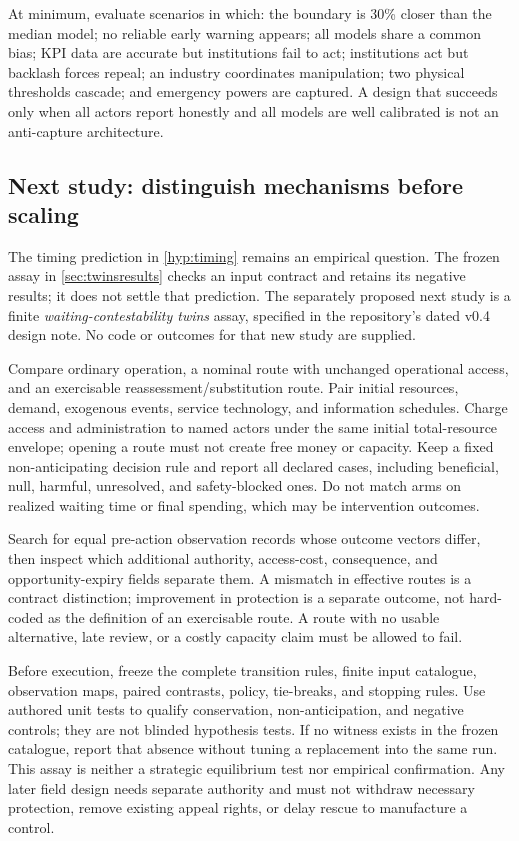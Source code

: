 \documentclass[11pt,a4paper]{article}
\numberwithin{equation}{section}
\theoremstyle{definition}
\theoremstyle{plain}
\theoremstyle{remark}
\begin{document}
At minimum, evaluate scenarios in which: the boundary is 30\% closer than the median model; no reliable early warning appears; all models share a common bias; KPI data are accurate but institutions fail to act; institutions act but backlash forces repeal; an industry coordinates manipulation; two physical thresholds cascade; and emergency powers are captured. A design that succeeds only when all actors report honestly and all models are well calibrated is not an anti-capture architecture.

\subsection{Next study: distinguish mechanisms before scaling}

The timing prediction in \cref{hyp:timing} remains an empirical question. The frozen assay in \cref{sec:twinsresults} checks an input contract and retains its negative results; it does not settle that prediction. The separately proposed next study is a finite \emph{waiting-contestability twins} assay, specified in the repository's dated v0.4 design note. No code or outcomes for that new study are supplied.

Compare ordinary operation, a nominal route with unchanged operational access, and an exercisable reassessment/substitution route. Pair initial resources, demand, exogenous events, service technology, and information schedules. Charge access and administration to named actors under the same initial total-resource envelope; opening a route must not create free money or capacity. Keep a fixed non-anticipating decision rule and report all declared cases, including beneficial, null, harmful, unresolved, and safety-blocked ones. Do not match arms on realized waiting time or final spending, which may be intervention outcomes.

Search for equal pre-action observation records whose outcome vectors differ, then inspect which additional authority, access-cost, consequence, and opportunity-expiry fields separate them. A mismatch in effective routes is a contract distinction; improvement in protection is a separate outcome, not hard-coded as the definition of an exercisable route. A route with no usable alternative, late review, or a costly capacity claim must be allowed to fail.

Before execution, freeze the complete transition rules, finite input catalogue, observation maps, paired contrasts, policy, tie-breaks, and stopping rules. Use authored unit tests to qualify conservation, non-anticipation, and negative controls; they are not blinded hypothesis tests. If no witness exists in the frozen catalogue, report that absence without tuning a replacement into the same run. This assay is neither a strategic equilibrium test nor empirical confirmation. Any later field design needs separate authority and must not withdraw necessary protection, remove existing appeal rights, or delay rescue to manufacture a control.
\end{document}
